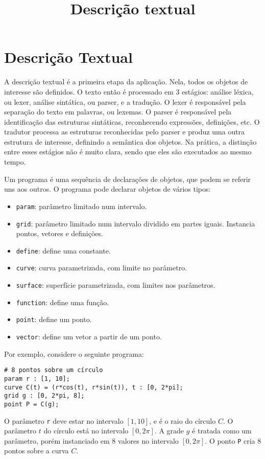 \documentclass[10pt,a4paper]{article}
\title{Descrição textual}
\date{}
\author{}
\begin{document}
\maketitle

\section{Descrição Textual}
A descrição textual é a primeira etapa da aplicação.
Nela, todos os objetos de interesse são definidos.
O texto então é processado em 3 estágios: análise léxica, ou lexer, análise sintática, ou parser, e a tradução.
O lexer é responsável pela separação do texto em palavras, ou lexemas. O parser é responsável pela identificação das estruturas sintáticas, reconhecendo expressões, definições, etc. O tradutor processa as estruturas reconhecidas pelo parser e produz uma outra estrutura de interesse, definindo a semântica dos objetos.
Na prática, a distinção entre esses estágios não é muito clara, sendo que eles são executados ao mesmo tempo.

Um programa é uma sequência de declarações de objetos, que podem se referir uns aos outros. O programa pode declarar objetos de vários tipos:
\begin{itemize}
\item \texttt{param}: parâmetro limitado num intervalo.
\item \texttt{grid}: parâmetro limitado num intervalo dividido em partes iguais. Instancia pontos, vetores e definições.
\item \texttt{define}: define uma constante.
\item \texttt{curve}: curva parametrizada, com limite no parâmetro.
\item \texttt{surface}: superfície parametrizada, com limites nos parâmetros.
\item \texttt{function}: define uma função.
\item \texttt{point}: define um ponto.
\item \texttt{vector}: define um vetor a partir de um ponto.
\end{itemize}

Por exemplo, considere o seguinte programa:

\begin{verbatim}
# 8 pontos sobre um círculo
param r : [1, 10];
curve C(t) = (r*cos(t), r*sin(t)), t : [0, 2*pi];
grid g : [0, 2*pi, 8];
point P = C(g);
\end{verbatim}

O parâmetro \texttt{r} deve estar no intervalo $[1, 10]$, e é o raio do círculo $C$. O parâmetro $t$ do círculo está no intervalo $[0, 2\pi]$.
A grade $g$ é tratada como um parâmetro, porém instanciado em $8$ valores no intervalo $[0, 2\pi]$.
O ponto \texttt{P} cria 8 pontos sobre a curva $C$.
\end{document}
